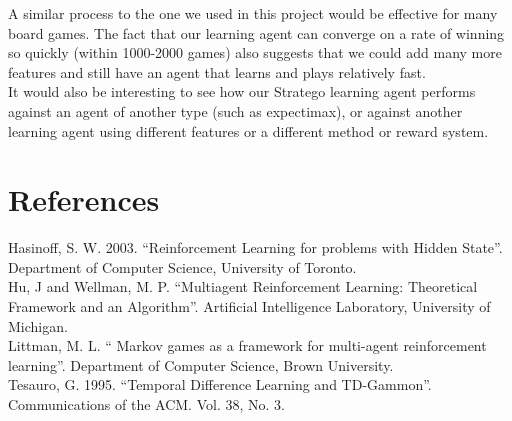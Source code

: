 \documentclass[letterpaper]{article}
\begin{document}
A similar process to the one we used in this project would be effective for many board games. The fact that our learning agent can converge on a rate of winning so quickly (within 1000-2000 games) also suggests that we could add many more features and still have an agent that learns and plays relatively fast.\\

It would also be interesting to see how our Stratego learning agent performs against an agent of another type (such as expectimax), or against another learning agent using different features or a different method or reward system.

\section{References}
Hasinoff, S. W. 2003. ``Reinforcement Learning for problems with Hidden State''. Department of Computer Science, University of Toronto.\\

Hu, J and Wellman, M. P. ``Multiagent Reinforcement Learning: Theoretical Framework and an Algorithm''. Artificial Intelligence Laboratory, University of Michigan.\\

Littman, M. L. `` Markov games as a framework for multi-agent reinforcement learning''. Department of Computer Science, Brown University.\\

Tesauro, G. 1995. ``Temporal Difference Learning and TD-Gammon''. Communications of the ACM. Vol. 38, No. 3.
\end{document}
